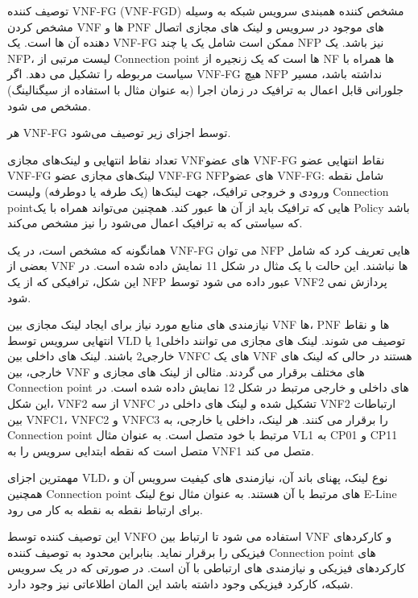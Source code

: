 توصیف کننده VNF-FG (VNF-FGD) مشخص کننده همبندی سرویس شبکه به وسیله مشخص کردن VNF ها و PNF های موجود در سرویس و لینک های مجازی اتصال دهنده آن ها است. یک VNF-FG ممکن است شامل یک یا چند NFP نیز باشد. یک NFP، لیست مرتبی از Connection point ها است که یک زنجیره از NF ها همراه با سیاست مربوطه را تشکیل می دهد. اگر VNF-FG هیچ NFP نداشته باشد، مسیر جلورانی قابل اعمال به ترافیک در زمان اجرا (به عنوان مثال با استفاده از سیگنالینگ) مشخص می شود.

هر VNF-FG توسط اجزای زیر توصیف می‌شود.

 تعداد نقاط انتهایی و لینک‌های مجازی
 VNFهای عضو VNF-FG
 نقاط انتهایی عضو VNF-FG
 لینک‌های مجازی عضو VNF-FG
 NFPهای عضو VNF-FG: شامل نقطه ورودی و خروجی ترافیک، جهت لینک‌ها (یک طرفه یا دوطرفه) ولیست Connection pointهایی که ترافیک باید از آن ها عبور کند. همچنین می‌تواند همراه با یک Policy باشد که سیاستی که به ترافیک اعمال می‌شود را نیز مشخص می‌کند.

همانگونه که مشخص است، در یک VNF-FG می توان NFP هایی تعریف کرد که شامل بعضی از VNF ها نباشند. این حالت با یک مثال در شکل 11 نمایش داده شده است. در این شکل، ترافیکی که از یک NFP عبور داده می شود توسط VNF2 پردازش نمی شود.


نیازمندی های منابع مورد نیاز برای ایجاد لینک مجازی بین VNF ها، PNF ها و نقاط انتهایی سرویس توسط VLD توصیف می شوند. لینک های مجازی می توانند داخلی1 یا خارجی2 باشند. لینک های داخلی بین VNFC های یک VNF هستند در حالی که لینک های خارجی، بین VNF های مختلف برقرار می گردند. مثالی از لینک های مجازی و Connection point های داخلی و خارجی مرتبط در شکل 12 نمایش داده شده است. در این شکل، VNF2 از سه VNFC تشکیل شده و لینک های داخلی در VNF2 ارتباطات بین VNFC1، VNFC2 و VNFC3 را برقرار می کنند. هر لینک، داخلی یا خارجی، به Connection point مرتبط با خود متصل است. به عنوان مثال VL1 به CP01 و CP11 متصل است که نقطه ابتدایی سرویس را به VNF1 متصل می کند.

مهمترین اجزای VLD، نوع لینک، پهنای باند آن، نیازمندی های کیفیت سرویس آن و همچنین Connection point های مرتبط با آن هستند. به عنوان مثال نوع لینک E-Line برای ارتباط نقطه به نقطه به کار می رود.

این توصیف کننده توسط VNFO استفاده می شود تا ارتباط بین VNF و کارکردهای فیزیکی را برقرار نماید. بنابراین محدود به توصیف کننده Connection point های کارکردهای فیزیکی و نیازمندی های ارتباطی با آن است. در صورتی که در یک سرویس شبکه، کارکرد فیزیکی وجود داشته باشد این المان اطلاعاتی نیز وجود دارد.

